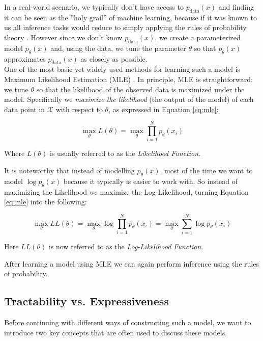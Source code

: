 In a real-world scenario, we typically don't have access to $p_{\text{data}}(x)$ and finding it can be seen as the ''holy grail'' of machine learning, because if it was known to us all inference tasks would reduce to simply applying the 
rules of probability theory \cite{pc_intro}. However since we don't know $p_{\text{data}}(x)$,
we create a parameterized model $p_\theta(x)$ and, using the data, we tune the parameter $\theta$ so that $p_\theta(x)$ approximates $p_{\text{data}}(x)$ as closely as possible. \\

One of the most basic yet widely used methods for learning such a model is Maximum Likelihood Estimation (MLE) \cite{ml_book}. 
In principle, MLE is straightforward: we tune $\theta$ so that the likelihood of the observed data is maximized under the model.
Specifically we \emph{maximize the likelihood} (the output of the model) of each data point in $\mathcal{X}$ with respect to $\theta$, as 
expressed in Equation \ref{eq:mle}: 

\begin{equation}
    \max_{\theta} L(\theta) = \max_{\theta} \prod_{i=1}^{N} p_\theta(x_i)
    \label{eq:mle}
\end{equation}

Where $L(\theta)$ is usually referred to as the \emph{Likelihood Function}.

It is noteworthy that instead of modelling $p_\theta(x)$, most of the time we want to model $\log p_\theta(x)$ because it typically is easier to work with. 
So instead of maximizing the Likelihood we maximize the Log-Likelihood, turning Equation \ref{eq:mle} into the following:

\begin{equation}
    \max_{\theta} LL(\theta) = \max_{\theta} \log \prod_{i=1}^{N} p_\theta(x_i) = \max_{\theta} \sum_{i=1}^{N} \log p_\theta(x_i)
    \label{eq:log_mle}
\end{equation}

Here $LL(\theta)$ is now referred to as the \emph{Log-Likelihood Function}. 

After learning a model using MLE we can again perform inference using the rules of probability. 

\subsection{Tractability vs. Expressiveness}

Before continuing with different ways of constructing such a model, we want to introduce two key concepts that are often 
used to discuss these models. 


